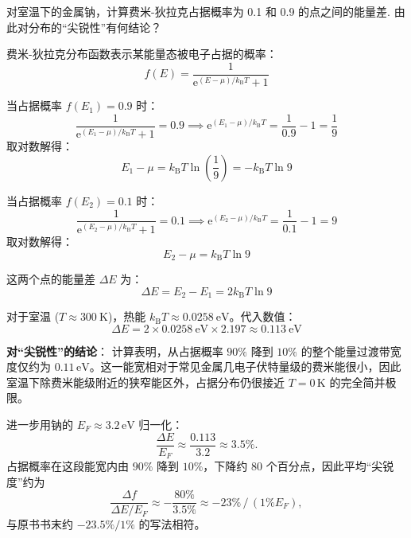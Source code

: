 \begin{exercise}\label{ex:27.3}
对室温下的金属钠，计算费米-狄拉克占据概率为 0.1 和 0.9 的点之间的能量差. 由此对分布的“尖锐性”有何结论？
\end{exercise}
\begin{solution}
费米-狄拉克分布函数表示某能量态被电子占据的概率：
$$ f(E) = \frac{1}{\mathrm{e}^{(E - \mu)/k_{\mathrm{B}} T} + 1} $$

当占据概率 $f(E_1) = 0.9$ 时：
$$ \frac{1}{\mathrm{e}^{(E_1 - \mu)/k_{\mathrm{B}} T} + 1} = 0.9 \implies \mathrm{e}^{(E_1 - \mu)/k_{\mathrm{B}} T} = \frac{1}{0.9} - 1 = \frac{1}{9} $$
取对数解得：
$$ E_1 - \mu = k_{\mathrm{B}} T \ln\left(\frac{1}{9}\right) = -k_{\mathrm{B}} T \ln 9 $$

当占据概率 $f(E_2) = 0.1$ 时：
$$ \frac{1}{\mathrm{e}^{(E_2 - \mu)/k_{\mathrm{B}} T} + 1} = 0.1 \implies \mathrm{e}^{(E_2 - \mu)/k_{\mathrm{B}} T} = \frac{1}{0.1} - 1 = 9 $$
取对数解得：
$$ E_2 - \mu = k_{\mathrm{B}} T \ln 9 $$

这两个点的能量差 $\Delta E$ 为：
$$ \Delta E = E_2 - E_1 = 2 k_{\mathrm{B}} T \ln 9 $$

对于室温 ($T \approx 300 \ \mathrm{K}$)，热能 $k_{\mathrm{B}} T \approx 0.0258 \ \mathrm{eV}$。代入数值：
$$ \Delta E = 2 \times 0.0258 \ \mathrm{eV} \times 2.197 \approx 0.113 \ \mathrm{eV} $$

\textbf{对“尖锐性”的结论}：
计算表明，从占据概率 $90\%$ 降到 $10\%$ 的整个能量过渡带宽度仅约为 $0.11\,\mathrm{eV}$。这一能宽相对于常见金属几电子伏特量级的费米能很小，因此室温下除费米能级附近的狭窄能区外，占据分布仍很接近 $T=0\,\mathrm K$ 的完全简并极限。

进一步用钠的 $E_F\approx3.2\,\mathrm{eV}$ 归一化：
$$
\frac{\Delta E}{E_F}\approx\frac{0.113}{3.2}\approx3.5\%.
$$
占据概率在这段能宽内由 $90\%$ 降到 $10\%$，下降约 $80$ 个百分点，因此平均“尖锐度”约为
$$
\frac{\Delta f}{\Delta E/E_F}\approx-\frac{80\%}{3.5\%}\approx-23\%\,/\,(1\%E_F),
$$
与原书书末约 $-23.5\%/1\%$ 的写法相符。
\end{solution}

